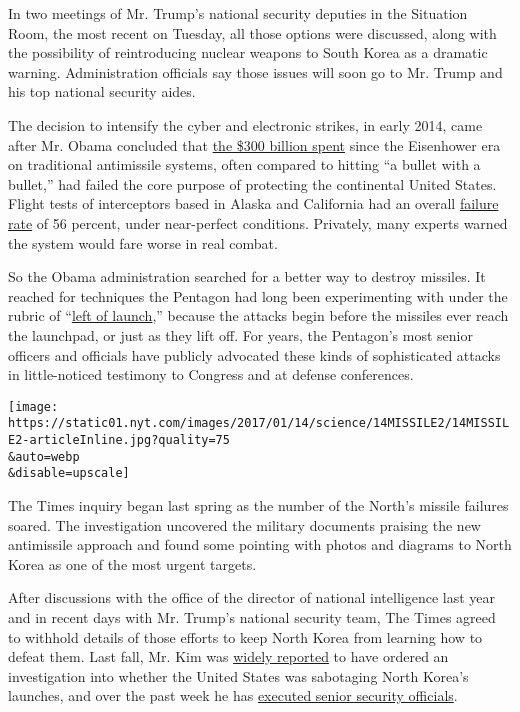 In two meetings of Mr. Trump's national security deputies in the
Situation Room, the most recent on Tuesday, all those options were
discussed, along with the possibility of reintroducing nuclear weapons
to South Korea as a dramatic warning. Administration officials say those
issues will soon go to Mr. Trump and his top national security aides.

The decision to intensify the cyber and electronic strikes, in early
2014, came after Mr. Obama concluded that
\href{http://wmdjunction.com/120413_missile_defense_costs.htm}{the \$300
billion spent} since the Eisenhower era on traditional antimissile
systems, often compared to hitting ``a bullet with a bullet,'' had
failed the core purpose of protecting the continental United States.
Flight tests of interceptors based in Alaska and California had an
overall
\href{https://www.mda.mil/global/documents/pdf/testrecord.pdf}{failure
rate} of 56 percent, under near-perfect conditions. Privately, many
experts warned the system would fare worse in real combat.

So the Obama administration searched for a better way to destroy
missiles. It reached for techniques the Pentagon had long been
experimenting with under the rubric of
``\href{http://missiledefenseadvocacy.org/alert/3132/}{left of
launch},'' because the attacks begin before the missiles ever reach the
launchpad, or just as they lift off. For years, the Pentagon's most
senior officers and officials have publicly advocated these kinds of
sophisticated attacks in little-noticed testimony to Congress and at
defense conferences.

\texttt{[image: https://static01.nyt.com/images/2017/01/14/science/14MISSILE2/14MISSILE2-articleInline.jpg?quality=75\\\&auto=webp\\\&disable=upscale]}

The Times inquiry began last spring as the number of the North's missile
failures soared. The investigation uncovered the military documents
praising the new antimissile approach and found some pointing with
photos and diagrams to North Korea as one of the most urgent targets.

After discussions with the office of the director of national
intelligence last year and in recent days with Mr. Trump's national
security team, The Times agreed to withhold details of those efforts to
keep North Korea from learning how to defeat them. Last fall, Mr. Kim
was
\href{https://www.nknews.org/2016/10/kim-jong-un-to-investigate-espionage-linked-to-failed-missile-launch-report/}{widely
reported} to have ordered an investigation into whether the United
States was sabotaging North Korea's launches, and over the past week he
has
\href{https://www.nytimes.com/aponline/2017/02/27/world/asia/ap-as-north-korea-executions.html}{executed
senior security officials}.

